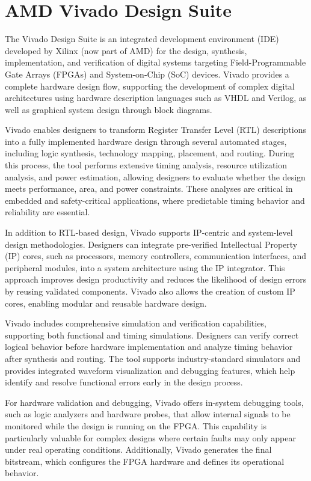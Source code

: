 \section{AMD Vivado Design Suite}
The Vivado Design Suite is an integrated development environment (IDE) developed by Xilinx (now part of AMD) for the design, synthesis, implementation, and verification of digital systems targeting Field-Programmable Gate Arrays (FPGAs) and System-on-Chip (SoC) devices. Vivado provides a complete hardware design flow, supporting the development of complex digital architectures using hardware description languages such as VHDL and Verilog, as well as graphical system design through block diagrams.

Vivado enables designers to transform Register Transfer Level (RTL) descriptions into a fully implemented hardware design through several automated stages, including logic synthesis, technology mapping, placement, and routing. During this process, the tool performs extensive timing analysis, resource utilization analysis, and power estimation, allowing designers to evaluate whether the design meets performance, area, and power constraints. These analyses are critical in embedded and safety-critical applications, where predictable timing behavior and reliability are essential.

In addition to RTL-based design, Vivado supports IP-centric and system-level design methodologies. Designers can integrate pre-verified Intellectual Property (IP) cores, such as processors, memory controllers, communication interfaces, and peripheral modules, into a system architecture using the IP integrator. This approach improves design productivity and reduces the likelihood of design errors by reusing validated components. Vivado also allows the creation of custom IP cores, enabling modular and reusable hardware design.

Vivado includes comprehensive simulation and verification capabilities, supporting both functional and timing simulations. Designers can verify correct logical behavior before hardware implementation and analyze timing behavior after synthesis and routing. The tool supports industry-standard simulators and provides integrated waveform visualization and debugging features, which help identify and resolve functional errors early in the design process.

For hardware validation and debugging, Vivado offers in-system debugging tools, such as logic analyzers and hardware probes, that allow internal signals to be monitored while the design is running on the FPGA. This capability is particularly valuable for complex designs where certain faults may only appear under real operating conditions. Additionally, Vivado generates the final bitstream, which configures the FPGA hardware and defines its operational behavior.

